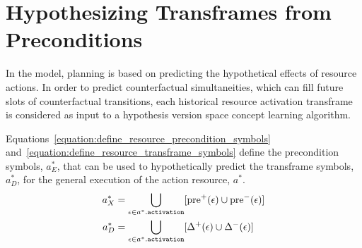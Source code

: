 
\section{Hypothesizing Transframes from Preconditions}

In the model, planning is based on predicting the hypothetical effects
of resource actions.  In order to predict counterfactual
simultaneities, which can fill future slots of counterfactual
transitions, each historical resource activation transframe is
considered as input to a hypothesis version space concept learning
algorithm.

Equations\ \ref{equation:define_resource_precondition_symbols}
and\ \ref{equation:define_resource_transframe_symbols} define the
precondition symbols, $a^*_E$, that can be used to hypothetically
predict the transframe symbols, $a^*_D$, for the general execution of
the action resource, $a^*$.
\begin{align}
\label{equation:define_resource_precondition_symbols}
  a^*_X &= \bigcup_{\epsilon \in a^*.\text{\tt{activation}}} [\text{pre}^{+}(\epsilon) \cup \text{pre}^{-}(\epsilon)] \\
\label{equation:define_resource_transframe_symbols}
  a^*_D &= \bigcup_{\epsilon \in a^*.\text{\tt{activation}}} [\Delta^{+}(\epsilon) \cup \Delta^{-}(\epsilon)]
\end{align}

